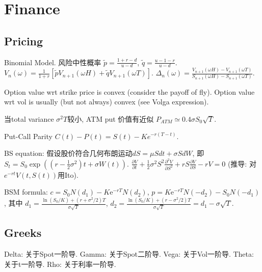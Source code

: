 \documentclass[UTF8]{ctexart}
\begin{document}
\section{Finance}

\subsection{Pricing}

Binomial Model.
风险中性概率 $\widetilde{p} = \frac{1+r-d}{u-d}$, $\widetilde{q} = \frac{u-1-r}{u-d}$.
$V_n(\omega)=\frac{1}{1+r}[\widetilde{p}V_{n+1}(\omega H) + \widetilde{q}V_{n+1}(\omega T)]$.
$\Delta_n(\omega) = \frac{V_{n+1}(\omega H)-V_{n+1}(\omega T)}{S_{n+1}(\omega H)-S_{n+1}(\omega T)}$.


Option value wrt strike price is convex (consider the payoff of fly).
Option value wrt vol is usually (but not always) convex (see Volga expression).

当total variance $\sigma^2 T$较小, ATM put 价值有近似 $P_{ATM}\simeq 0.4\sigma S_0\sqrt{T}$.

Put-Call Parity $C(t)-P(t) = S(t) - Ke^{-r(T-t)}$.

BS equation: 假设股价符合几何布朗运动$dS=\mu S d t+\sigma S dW$, 即$S_t = S_0 \exp ((r-\frac{1}{2}\sigma^2)t+\sigma W(t))$.
$\frac{\partial V}{\partial t}+\frac{1}{2} \sigma^{2} S^{2} \frac{\partial^{2} V}{\partial S^{2}}+r S \frac{\partial V}{\partial S}-r V=0$
(推导: 对$e^{-rt}V(t,S(t))$用Ito).

BSM formula:
$c=S_0 N\left(d_1\right)-K \mathrm{e}^{-r T} N\left(d_2\right) $,
$p=K \mathrm{e}^{-r T} N\left(-d_2\right)-S_0 N\left(-d_1\right) $, 其中
$d_1=\frac{\ln \left(S_0 / K\right)+\left(r+\sigma^2 / 2\right) T}{\sigma \sqrt{T}} $,
$d_2=\frac{\ln \left(S_0 / K\right)+\left(r-\sigma^2 / 2\right) T}{\sigma \sqrt{T}}=d_1-\sigma \sqrt{T}$.


\subsection{Greeks}
Delta: 关于Spot一阶导.
Gamma: 关于Spot二阶导.
Vega: 关于Vol一阶导.
Theta: 关于t一阶导.
Rho: 关于利率一阶导.
\end{document}

